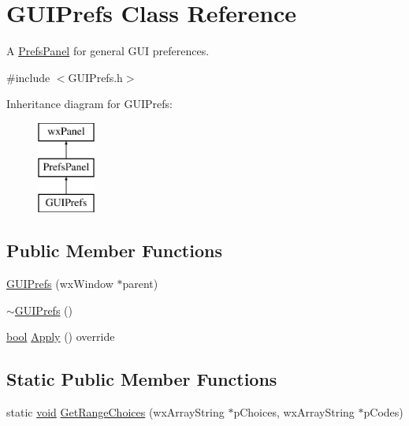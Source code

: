 \hypertarget{class_g_u_i_prefs}{}\section{G\+U\+I\+Prefs Class Reference}
\label{class_g_u_i_prefs}


A \hyperlink{class_prefs_panel}{Prefs\+Panel} for general G\+UI preferences.  




{\ttfamily \#include $<$G\+U\+I\+Prefs.\+h$>$}

Inheritance diagram for G\+U\+I\+Prefs\+:\begin{figure}[H]
\begin{center}
\leavevmode
\includegraphics[height=3.000000cm]{class_g_u_i_prefs}
\end{center}
\end{figure}
\subsection*{Public Member Functions}
\begin{DoxyCompactItemize}
\item 
\hyperlink{class_g_u_i_prefs_ad793a472154b7312439853f29b244230}{G\+U\+I\+Prefs} (wx\+Window $\ast$parent)
\item 
\hyperlink{class_g_u_i_prefs_a716ff9e3e78a1546f4dfe414e2a53559}{$\sim$\+G\+U\+I\+Prefs} ()
\item 
\hyperlink{mac_2config_2i386_2lib-src_2libsoxr_2soxr-config_8h_abb452686968e48b67397da5f97445f5b}{bool} \hyperlink{class_g_u_i_prefs_ac69a8ee4b930e3a4e5f1f088167c0a83}{Apply} () override
\end{DoxyCompactItemize}
\subsection*{Static Public Member Functions}
\begin{DoxyCompactItemize}
\item 
static \hyperlink{sound_8c_ae35f5844602719cf66324f4de2a658b3}{void} \hyperlink{class_g_u_i_prefs_a7e4e16637453c3afdf9ed41bf2cbf835}{Get\+Range\+Choices} (wx\+Array\+String $\ast$p\+Choices, wx\+Array\+String $\ast$p\+Codes)
\end{DoxyCompactItemize}


